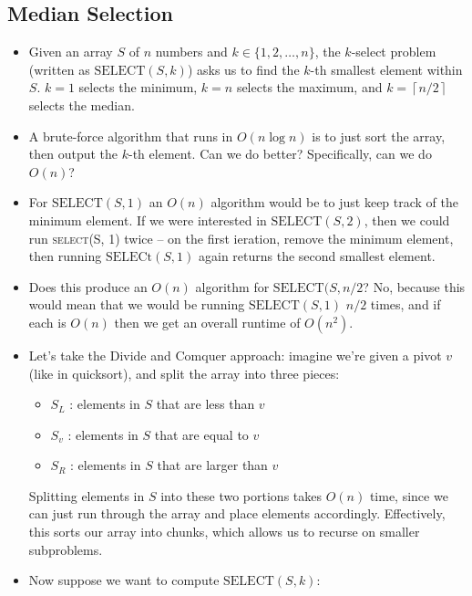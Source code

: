 \subsection{Median Selection}
\begin{itemize}
	\item Given an array \( S \) of \( n \) numbers and \( k \in \{1, 2, \dots, n\}  \), the \( k \)-select problem (written 
		as \( \text{SELECT}(S, k) \)) asks us 
		to find the \( k \)-th smallest element within \( S \). \( k = 1 \) selects the minimum, \( k = n \) selects
		 the maximum, and \( k = \left\lceil n / 2 \right\rceil  \) selects the median. 
	 \item A brute-force algorithm that runs in \( O(n \log n) \) is to just sort the array, then output the \( k \)-th element. 
		 Can we do better? Specifically, can we do \( O(n) \)?
	 \item For \( \text{SELECT}(S, 1) \) an \( O(n) \) algorithm would be to just keep track of the minimum element. If we were 
		 interested in \( \text{SELECT}(S, 2) \), then we could run \textsc{select(S, 1)} twice -- on the first ieration, 
		 remove the minimum element, then running \( \text{SELECt}(S, 1) \) again returns the second smallest 
		 element. 
	 \item Does this produce an \( O(n) \) algorithm for \( \text{SELECT}(S, n / 2 \)? No, because this would mean that we 
		 would be running  \( \text{SELECT}(S, 1) \)  \( n / 2 \) times, and if each is \( O(n) \) then we get 
		 an overall runtime of \( O(n^2) \). 
	 \item Let's take the Divide and Comquer approach: imagine we're given a pivot \( v \) (like in quicksort), and split the array 
		 into three pieces:
		 \begin{itemize}
		 	\item \( S_L \) : elements in \( S \) that are less than \( v \) 
			\item \( S_v \) : elements in \( S \) that are equal to \( v \) 
			\item \( S_R \) : elements in \( S \) that are larger than \( v \)
		 \end{itemize}
		Splitting elements in  \( S \) into these two portions takes \( O(n) \) time, since we can just run through the array 
		and place elements accordingly. Effectively, this sorts our array into chunks, which allows us to recurse on smaller 
		subproblems. 
	\item Now suppose we want to compute \( \text{SELECT}(S, k) \):
		\begin{itemize}

\end{itemize}
\end{itemize}
